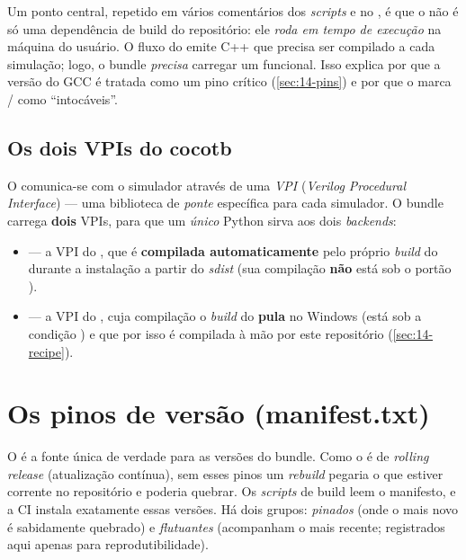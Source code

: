 \medskip

Um ponto central, repetido em vários comentários dos \emph{scripts} e no
, é que o  não é só uma dependência de build do
repositório: ele \emph{roda em tempo de execução} na máquina do usuário. O fluxo
do  emite C++ que precisa ser compilado a cada simulação; logo, o
bundle \emph{precisa} carregar um  funcional. Isso explica por que a
versão do GCC é tratada como um pino crítico (\autoref{sec:14-pins}) e por que o
 marca / como
\enquote{intocáveis}.

\subsection{Os dois VPIs do cocotb}

O  comunica-se com o simulador através de uma \emph{VPI} (\emph{Verilog
Procedural Interface}) --- uma biblioteca de \emph{ponte} específica para cada
simulador. O bundle carrega \textbf{dois} VPIs, para que um \emph{único} Python
sirva aos dois \emph{backends}:

\begin{itemize}
  \item {} --- a VPI do , que é
        \textbf{compilada automaticamente} pelo próprio \emph{build} do
         durante a instalação a partir do \emph{sdist} (sua
        compilação \textbf{não} está sob o portão ).
  \item {} --- a VPI do , cuja
        compilação o \emph{build} do  \textbf{pula} no Windows
        (está sob a condição ) e que por isso é
        compilada à mão por este repositório (\autoref{sec:14-recipe}).
\end{itemize}

\section{Os pinos de versão (manifest.txt)}
\label{sec:14-pins}

O  é a fonte única de verdade para as versões do bundle. Como
o  é de \emph{rolling release} (atualização contínua), sem esses pinos
um \emph{rebuild} pegaria o que estiver corrente no repositório e poderia quebrar.
Os \emph{scripts} de build leem o manifesto, e a CI instala exatamente essas
versões. Há dois grupos: \emph{pinados} (onde o mais novo é sabidamente quebrado)
e \emph{flutuantes} (acompanham o  mais recente; registrados aqui
apenas para reprodutibilidade).

